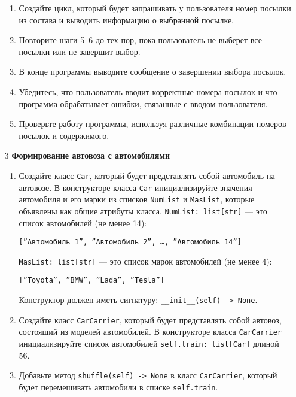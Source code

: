 \begin{enumerate}
\begin{enumerate}
    \item Создайте цикл, который будет запрашивать у пользователя номер посылки из состава и выводить информацию о выбранной посылке.

    \item Повторите шаги 5–6 до тех пор, пока пользователь не выберет все посылки или не завершит выбор.

    \item В конце программы выводите сообщение о завершении выбора посылок.

    \item Убедитесь, что пользователь вводит корректные номера посылок и что программа обрабатывает ошибки, связанные с вводом пользователя.

    \item Проверьте работу программы, используя различные комбинации номеров посылок и содержимого.
\end{enumerate}

\item[3] \textbf{Формирование автовоза с автомобилями}
\begin{enumerate}
    \item Создайте класс \texttt{Car}, который будет представлять собой автомобиль на автовозе. В конструкторе класса \texttt{Car} инициализируйте значения автомобиля и его марки из списков \texttt{NumList} и \texttt{MasList}, которые объявлены как общие атрибуты класса. \texttt{NumList: list[str]} — это список автомобилей (не менее 14): 
    \begin{center}
        \texttt{[''Автомобиль\_1'', ''Автомобиль\_2'', \dots, ''Автомобиль\_14'']}
    \end{center}
    \texttt{MasList: list[str]} — это список марок автомобилей (не менее 4):
    \begin{center}
        \texttt{[''Toyota'', ''BMW'', ''Lada'', ''Tesla'']}
    \end{center}
    Конструктор должен иметь сигнатуру: \texttt{\_\_init\_\_(self) -> None}.

    \item Создайте класс \texttt{CarCarrier}, который будет представлять собой автовоз, состоящий из моделей автомобилей. В конструкторе класса \texttt{CarCarrier} инициализируйте список автомобилей \texttt{self.train: list[Car]} длиной 56.

    \item Добавьте метод \texttt{shuffle(self) -> None} в класс \texttt{CarCarrier}, который будет перемешивать автомобили в списке \texttt{self.train}.


\end{enumerate}
\end{enumerate}
